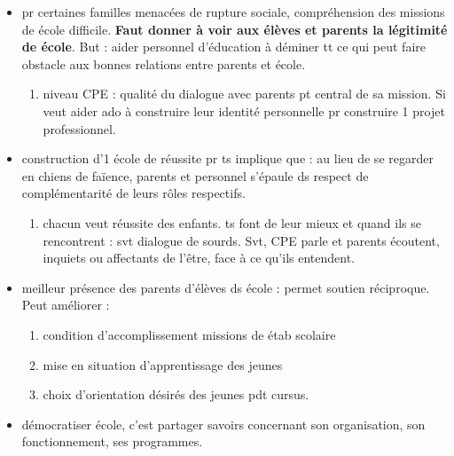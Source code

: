 \documentclass[12pt]{report}
\begin{document}
\begin{itemize}
\begin{itemize}
\item pr certaines familles menacées de rupture sociale, compréhension des missions de école difficile. \textbf{Faut donner à voir aux élèves et parents la légitimité de école}. But : aider personnel d'éducation à déminer tt ce qui peut faire obstacle aux bonnes relations entre parents et école.\\
\begin{enumerate}
\item niveau CPE : qualité du dialogue avec parents pt central de sa mission. Si veut aider ado à construire leur identité personnelle pr construire 1 projet professionnel.\\
\end{enumerate}

\item construction d'1 école de réussite pr ts implique que : au lieu de se regarder en chiens de faïence, parents et personnel s'épaule ds respect de complémentarité de leurs rôles respectifs.\\ 
\begin{enumerate}
\item chacun veut réussite des enfants. ts font de leur mieux et quand ils se rencontrent : svt dialogue de sourds. Svt, CPE parle et parents écoutent, inquiets ou affectants de l'être, face à ce qu'ils entendent.\\
 \end{enumerate}

\item meilleur présence des parents d'élèves ds école : permet soutien réciproque. Peut améliorer : 
\begin{enumerate}
\item condition d'accomplissement missions de étab scolaire \\
\item mise en situation d'apprentissage des jeunes \\
\item choix d'orientation désirés des jeunes pdt cursus. \\
\end{enumerate}

\item démocratiser école, c'est partager savoirs concernant son organisation, son fonctionnement, ses programmes.\\


\end{itemize}
\end{itemize}
\end{document}
